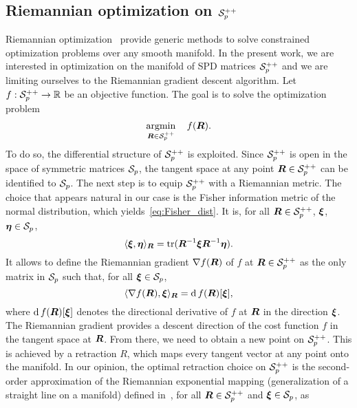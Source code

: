 \documentclass{article}
\theoremstyle{plain}
\theoremstyle{definition}
\theoremstyle{remark}
\begin{document}
\subsection{Riemannian optimization on $\mathcal{S}^{++}_{p}$}
\label{sec:preliminaries:Ropt}
Riemannian optimization~\cite{absil2009optimization,boumal2023introduction} provide generic methods to solve constrained optimization problems over any smooth manifold.
In the present work, we are interested in optimization on the manifold of SPD matrices $\mathcal{S}^{++}_{p}$ and we are limiting ourselves to the Riemannian gradient descent algorithm.
Let $f:\mathcal{S}^{++}_{p}\to\mathbb{R}$ be an objective function.
The goal is to solve the optimization problem
\begin{equation*}
    \operatorname*{argmin}_{\boldsymbol{R}\in\mathcal{S}^{++}_{p}} \quad f(\boldsymbol{R}).
\end{equation*}
To do so, the differential structure of $\mathcal{S}^{++}_{p}$ is exploited.
Since $\mathcal{S}^{++}_{p}$ is open in the space of symmetric matrices $\mathcal{S}_{p}$, the tangent space at any point $\boldsymbol{R}\in\mathcal{S}^{++}_{p}$ can be identified to $\mathcal{S}_{p}$.
%
The next step is to equip $\mathcal{S}^{++}_{p}$ with a Riemannian metric.
The choice that appears natural in our case is the Fisher information metric of the normal distribution, which yields~\eqref{eq:Fisher_dist}. 
It is, for all $\boldsymbol{R}\in\mathcal{S}^{++}_{p}$, $\boldsymbol{\xi}$, $\boldsymbol{\eta}\in\mathcal{S}_{p}$,
\begin{equation}
    \langle \boldsymbol{\xi}, \boldsymbol{\eta} \rangle_{\boldsymbol{R}} = 
    \operatorname{tr}(\boldsymbol{R}^{-1}\boldsymbol{\xi}\boldsymbol{R}^{-1}\boldsymbol{\eta}).
\label{eq:Fisher_metric}
\end{equation}
%
It allows to define the Riemannian gradient $\nabla f(\boldsymbol{R})$ of $f$ at $\boldsymbol{R}\in\mathcal{S}^{++}_{p}$ as the only matrix in $\mathcal{S}_{p}$ such that, for all $\boldsymbol{\xi}\in\mathcal{S}_{p}$,
\begin{equation}
    \langle \nabla f(\boldsymbol{R}), \boldsymbol{\xi} \rangle_{\boldsymbol{R}} = \operatorname{d} f(\boldsymbol{R})[\boldsymbol{\xi}],
\end{equation}
where $\operatorname{d} f(\boldsymbol{R})[\boldsymbol{\xi}]$ denotes the directional derivative of $f$ at $\boldsymbol{R}$ in the direction $\boldsymbol{\xi}$.
The Riemannian gradient provides a descent direction of the cost function $f$ in the tangent space at $\boldsymbol{R}$.
%
From there, we need to obtain a new point on $\mathcal{S}^{++}_{p}$.
This is achieved by a retraction $R$, which maps every tangent vector at any point onto the manifold.
In our opinion, the optimal retraction choice on $\mathcal{S}^{++}_{p}$ is the second-order approximation of the Riemannian exponential mapping (generalization of a straight line on a manifold) defined in~\cite{jeuris2012survey}, for all $\boldsymbol{R}\in\mathcal{S}^{++}_{p}$ and $\boldsymbol{\xi}\in\mathcal{S}_{p}$, as
\end{document}
